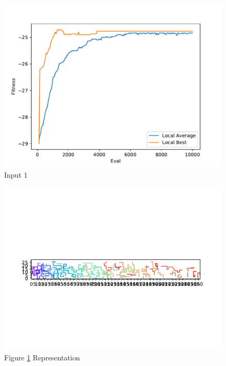 \documentclass{standalone}
\begin{document}
\begin{figure}[!htb]
	\caption{Input 1}
	\label{fig:graph_1014}
	\includegraphics[width=\textwidth]{../graphs/graphs/1014.pdf}
\end{figure}


\begin{figure}[!htb]
	\caption{Figure \ref{fig:graph_1014} Representation}
	\label{fig:picture_1014}
	\includegraphics[width=\textwidth]{../graphs/picture/1014.pdf}
\end{figure}
\end{document}
